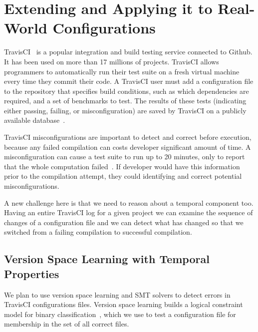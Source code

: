 
\section{Extending \app and Applying it to Real-World Configurations}
\label{sec:travis}

TravisCI~\cite{API} is a popular integration and build testing service 
connected to Github. It has been used on more than 17 
millions of projects. 
TravisCI allows programmers to automatically run their test suite on a fresh virtual machine every time they commit their code.
A TravisCI user must add a configuration file to the repository that specifies build conditions, 
such as which dependencies are required, and a set of benchmarks to test. 
The results of these tests (indicating either passing, failing, or misconfiguration) 
are saved by TravisCI on a publicly available database~\cite{API}.

TravisCI misconfigurations are important to detect and correct before execution,
because any failed compilation can costs developer significant amount 
of time. A misconfiguration can cause a test suite to run up to 20 
minutes, only to report that the whole computation failed~\cite{API}.
If developer would have this information prior to the compilation attempt, they could
 identifying and correct potential misconfigurations.

A new challenge here is that we need to reason about a 
temporal component too. Having an entire TravisCI log for a given
project we can examine the sequence of changes of a configuration file
and we can detect what has changed so that we switched from a failing 
compilation to successful compilation. 


\subsection{Version Space Learning with Temporal Properties} 

We plan to use version space learning and SMT solvers to detect errors in 
TravisCI configurations files. Version space learning 
builds a logical constraint model for binary
classification~\cite{mitchell77}, which we use to test a configuration file for 
membership in the set of all correct files.

